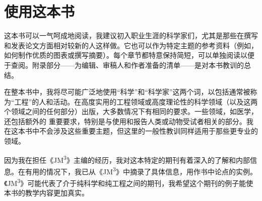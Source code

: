 \section*{使用这本书}
这本书可以一气呵成地阅读，我建议初入职业生涯的科学家们，尤其是那些在撰写和发表论文方面相对较新的人这样做。它也可以作为特定主题的参考资料（例如，如何制作优质的图表或撰写摘要）。每个章节都特意保持简短，可以单独阅读以便于查阅。附录部分——为编辑、审稿人和作者准备的清单——是对本书教训的总结。

在整本书中，我将尽可能广泛地使用“科学”和“科学家”这两个词，以包括通常被称为“工程”的人和活动。在高度实用的工程领域或高度理论性的科学领域（以及这两个领域之间的任何部分）出版，大多数情况下有相同的要求。一些领域，如医学，还包括额外的 重要要求，特别是与使用和报告人类或动物受试者相关的部分。我在这本书中不会涉及这些重要主题，但这里的一般性教训同样适用于那些更专业的领域。

因为我在担任《JM\textsuperscript{3}》主编的经历，我对这本特定的期刊有着深入的了解和内部信息。在有用的情况下，我已从《JM\textsuperscript{3}》中摘录了具体信息，用作书中论点的实例。《JM\textsuperscript{3}》可能代表了介于纯科学和纯工程之间的期刊，我希望这个期刊的例子能使本书的教学内容更加真实。

